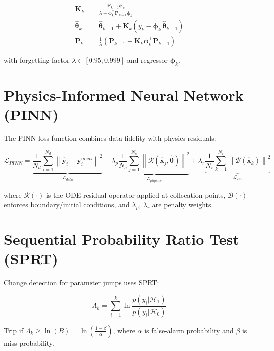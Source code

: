 \documentclass[11pt,a4paper]{report}
\newcommand{\bvec}[1]{\mathbf{#1}}
\newcommand{\norm}[1]{\left\lVert#1\right\rVert}
\begin{document}
\begin{align}
\bvec{K}_k &= \frac{\bvec{P}_{k-1}\bvec{\phi}_k}{\lambda + \bvec{\phi}_k^\top\bvec{P}_{k-1}\bvec{\phi}_k} \label{eq:rls_gain}\\
\hat{\bvec{\theta}}_k &= \hat{\bvec{\theta}}_{k-1} + \bvec{K}_k\left(y_k - \bvec{\phi}_k^\top\hat{\bvec{\theta}}_{k-1}\right) \label{eq:rls_update}\\
\bvec{P}_k &= \frac{1}{\lambda}\left(\bvec{P}_{k-1} - \bvec{K}_k\bvec{\phi}_k^\top\bvec{P}_{k-1}\right) \label{eq:rls_cov}
\end{align}

with forgetting factor $\lambda \in [0.95, 0.999]$ and regressor $\bvec{\phi}_k$.

\section{Physics-Informed Neural Network (PINN)}

The PINN loss function combines data fidelity with physics residuals:

\begin{equation}
\label{eq:pinn_loss}
\mathcal{L}_{PINN} = \underbrace{\frac{1}{N_d}\sum_{i=1}^{N_d}\norm{\hat{\bvec{y}}_i - \bvec{y}_i^{meas}}^2}_{\mathcal{L}_{data}}
+ \lambda_p \underbrace{\frac{1}{N_c}\sum_{j=1}^{N_c}\norm{\mathcal{R}(\hat{\bvec{x}}_j,\hat{\bvec{\theta}})}^2}_{\mathcal{L}_{physics}}
+ \lambda_r \underbrace{\frac{1}{N_r}\sum_{k=1}^{N_r}\norm{\mathcal{B}(\hat{\bvec{x}}_k)}^2}_{\mathcal{L}_{BC}}
\end{equation}

where $\mathcal{R}(\cdot)$ is the ODE residual operator applied at collocation points, $\mathcal{B}(\cdot)$ enforces boundary/initial conditions, and $\lambda_p$, $\lambda_r$ are penalty weights.

\section{Sequential Probability Ratio Test (SPRT)}

Change detection for parameter jumps uses SPRT:

\begin{equation}
\label{eq:sprt}
\Lambda_k = \sum_{i=1}^{k}\ln\frac{p(y_i|\mathcal{H}_1)}{p(y_i|\mathcal{H}_0)}
\end{equation}

Trip if $\Lambda_k \geq \ln(B) = \ln\!\left(\frac{1-\beta}{\alpha}\right)$, where $\alpha$ is false-alarm probability and $\beta$ is miss probability.
\end{document}

